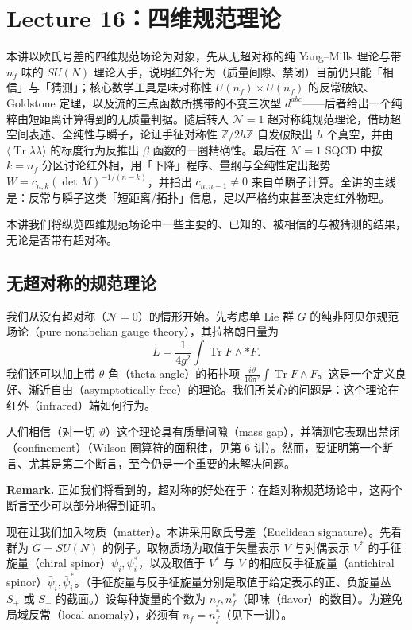 \section{Lecture 16：四维规范理论}

\begin{keytakeaways}
本讲以欧氏号差的四维规范场论为对象，先从无超对称的纯 Yang--Mills 理论与带 $n_f$ 味的 $SU(N)$ 理论入手，说明红外行为（质量间隙、禁闭）目前仍只能「相信」与「猜测」；核心数学工具是味对称性 $U(n_f)\times U(n_f)$ 的反常破缺、Goldstone 定理，以及流的三点函数所携带的不变三次型 $d^{abc}$——后者给出一个纯粹由短距离计算得到的无质量判据。随后转入 $\mathcal{N}=1$ 超对称纯规范理论，借助超空间表述、全纯性与瞬子，论证手征对称性 $\mathbb{Z}/2h\mathbb{Z}$ 自发破缺出 $h$ 个真空，并由 $\langle\operatorname{Tr}\lambda\lambda\rangle$ 的标度行为反推出 $\beta$ 函数的一圈精确性。最后在 $\mathcal{N}=1$ SQCD 中按 $k=n_f$ 分区讨论红外相，用「下降」程序、量纲与全纯性定出超势 $W=c_{n,k}(\det M)^{-1/(n-k)}$，并指出 $c_{n,n-1}\ne0$ 来自单瞬子计算。全讲的主线是：反常与瞬子这类「短距离/拓扑」信息，足以严格约束甚至决定红外物理。
\end{keytakeaways}


本讲我们将纵览四维规范场论中一些主要的、已知的、被相信的与被猜测的结果，无论是否带有超对称。

\subsection{无超对称的规范理论}

我们从没有超对称（$\mathcal{N}=0$）的情形开始。先考虑单 Lie 群 $G$ 的纯非阿贝尔规范场论（pure nonabelian gauge theory），其拉格朗日量为
\[
L=\frac{1}{4g^2}\int\operatorname{Tr}F\wedge *F .
\]
我们还可以加上带 $\theta$ 角（theta angle）的拓扑项 $\frac{i\vartheta}{16\pi^2}\int\operatorname{Tr}F\wedge F$。这是一个定义良好、渐近自由（asymptotically free）的理论。我们所关心的问题是：这个理论在红外（infrared）端如何行为。

人们相信（对一切 $\vartheta$）这个理论具有质量间隙（mass gap），并猜测它表现出禁闭（confinement）（Wilson 圈算符的面积律，见第 6 讲）。然而，要证明第一个断言、尤其是第二个断言，至今仍是一个重要的未解决问题。

\textbf{Remark.} 正如我们将看到的，超对称的好处在于：在超对称规范场论中，这两个断言至少可以部分地得到证明。

现在让我们加入物质（matter）。本讲采用欧氏号差（Euclidean signature）。先看群为 $G=SU(N)$ 的例子。取物质场为取值于矢量表示 $V$ 与对偶表示 $V^*$ 的手征旋量（chiral spinor）$\psi_i,\psi_i^*$，以及取值于 $V^*$ 与 $V$ 的相应反手征旋量（antichiral spinor）$\bar\psi_i,\bar\psi_i^*$。（手征旋量与反手征旋量分别是取值于给定表示的正、负旋量丛 $S_+$ 或 $S_-$ 的截面。）设每种旋量的个数为 $n_f,n_f^*$（即味（flavor）的数目）。为避免局域反常（local anomaly），必须有 $n_f=n_f^*$（见下一讲）。

